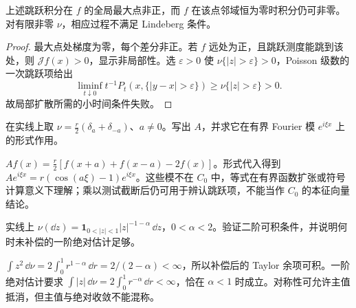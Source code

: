 \begin{proposition}[最大值原理并不等于局部性]
上述跳跃积分在 $f$ 的全局最大点非正，而 $f$ 在该点邻域恒为零时积分仍可非零。对有限非零 $\nu$，相应过程不满足 Lindeberg 条件。
\end{proposition}
\begin{proof}
最大点处梯度为零，每个差分非正。若 $f$ 远处为正，且跳跃测度能跳到该处，则 $\mathcal Jf(x)>0$，显示非局部性。选 $\varepsilon>0$ 使 $\nu\{|z|>\varepsilon\}>0$，Poisson 级数的一次跳跃项给出
\[
 \liminf_{t\downarrow0}t^{-1}P_t(x,\{|y-x|>\varepsilon\})
 \ge\nu\{|z|>\varepsilon\}>0.
\]
故局部扩散所需的小时间条件失败。
\end{proof}

\begin{exercise}[对称跳跃的符号]\label{ex:y13-jump-symbol}
在实线上取 $\nu=\tfrac r2(\delta_a+\delta_{-a})$、$a\ne0$。写出 $A$，并求它在有界 Fourier 模 $e^{i\xi x}$ 上的形式作用。
\end{exercise}
\begin{solution}
$Af(x)=\tfrac r2[f(x+a)+f(x-a)-2f(x)]$。形式代入得到 $Ae^{i\xi x}=r(\cos(a\xi)-1)e^{i\xi x}$。这些模不在 $C_0$ 中，等式在有界函数扩张或符号计算意义下理解；乘以测试截断后仍可用于辨认跳跃项，不能当作 $C_0$ 的本征向量结论。
\end{solution}

\begin{exercise}[小跳跃的补偿]\label{ex:y13-small-jumps}
实线上 $\nu(\dd z)=\mathbf1_{0<|z|<1}|z|^{-1-\alpha}\,\dd z$，$0<\alpha<2$。验证二阶可积条件，并说明何时未补偿的一阶绝对估计足够。
\end{exercise}
\begin{solution}
$\int z^2\,\dd\nu=2\int_0^1r^{1-\alpha}\,\dd r=2/(2-\alpha)<\infty$，所以补偿后的 Taylor 余项可积。一阶绝对估计要求 $\int|z|\,\dd\nu=2\int_0^1r^{-\alpha}\,\dd r<\infty$，恰在 $\alpha<1$ 时成立。对称性可允许主值抵消，但主值与绝对收敛不能混称。
\end{solution}
